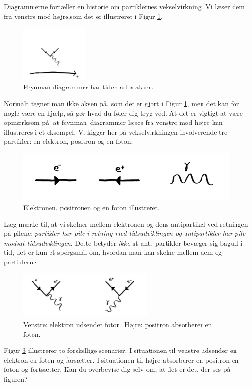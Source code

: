 Diagrammerne fortæller en historie om partiklernes vekselvirkning. Vi læser dem fra
venstre mod højre,som det er illustreret i Figur \ref{fig:axis}.
\begin{figure}[h!]
  \centering
  \includegraphics[width=0.3\textwidth]{KernePartikel/fig_p/axis2.png}
  \caption{ Feynman-diagrammer har tiden ad $x$-aksen.}
  \label{fig:axis}
\end{figure}
Normalt tegner man ikke aksen på, som det er gjort i Figur
\ref{fig:axis}, men det kan for nogle være en hjælp, så gør hvad du
føler dig tryg ved. At det er vigtigt at være opmærksom på, at
feynman--diagrammer læses fra venstre mod højre kan illustreres i et
eksempel. Vi kigger her på vekselvirkningen involverende tre
partikler: en elektron, positron og en foton.
\begin{figure}[h!]
  \centering
  \includegraphics[width=8 cm]{KernePartikel/fig_p/elektron_positron2.png}
  \caption{Elektronen, positronen og en foton illustreret.}
  \label{fig:elektron_positron}
\end{figure}
Læg mærke til, at vi skelner mellem elektronen og dens antipartikel
ved retningen på pilene: \emph{partikler har pile i retning med
  tidsudviklingen og antipartikler har pile modsat
  tidsudviklingen}. Dette betyder \emph{ikke} at anti--partikler bevæger sig
bagud i tid, det er kun et spørgsmål om, hvordan man kan skelne mellem
dem og partiklerne.
\begin{figure}[h!]
  \centering
  \includegraphics[width=0.6\textwidth]{KernePartikel/fig_p/case_1and22.png}
  \caption{ Venstre: elektron udsender foton. Højre: positron
      absorberer en foton.}
  \label{fig:case_1and2}
\end{figure}
Figur \ref{fig:case_1and2} illustrerer to forskellige scenarier. I
situationen til venstre udsender en elektron en foton og forsætter. I
situationen til højre absorberer en positron en foton og
fortsætter. Kan du overbevise dig selv om, at det er det, der ses på
figuren?

